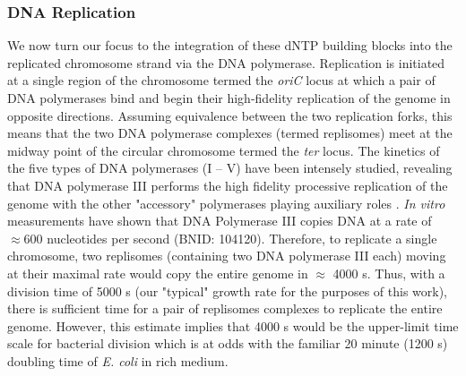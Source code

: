\subsubsection{DNA Replication}
We now turn our focus to the integration of
these dNTP building blocks into the replicated chromosome strand via the DNA
polymerase. Replication is initiated at a
single region of the chromosome termed the \textit{oriC} locus at which a pair
of DNA polymerases bind and begin their high-fidelity replication of the genome
in opposite directions. Assuming equivalence between the two replication forks,
this means that the two DNA polymerase complexes (termed replisomes) meet at the
midway point of the circular chromosome termed the \textit{ter} locus. The
kinetics of the five types of DNA polymerases (I -- V) have been intensely
studied, revealing that DNA polymerase III performs the high fidelity processive
replication of the genome with the other "accessory" polymerases playing
auxiliary roles \citep{fijalkowska2012}. \textit{In vitro} measurements have
shown that DNA Polymerase III copies DNA at a rate of $\approx 600$ nucleotides
per second (BNID: 104120). Therefore, to replicate a single
chromosome, two replisomes (containing two DNA polymerase III each) moving at their maximal rate would copy the
entire genome in $\approx$ 4000 s. Thus, with a division time of 5000 s (our
"typical" growth rate for the purposes of this work), there is sufficient time
for a pair of replisomes complexes to replicate the entire genome.
However, this estimate implies that 4000 s would be the upper-limit time scale
for bacterial division which is at odds with the familiar 20 minute (1200 s)
doubling time of \textit{E. coli} in rich medium.

